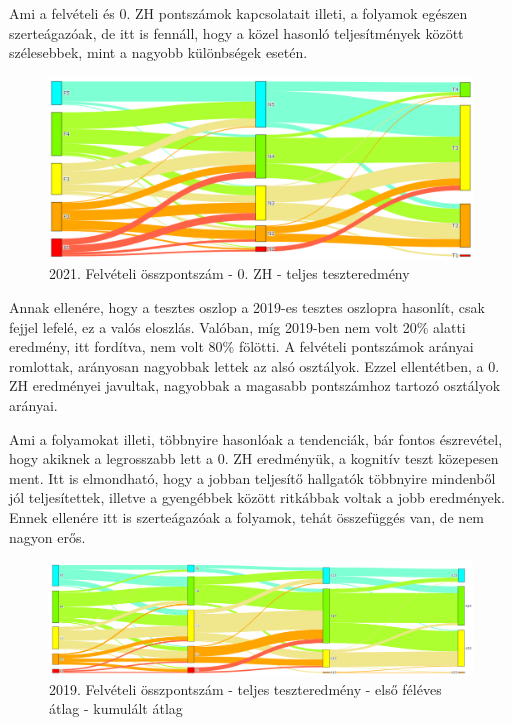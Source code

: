\documentclass[12pt]{article}
\begin{document}
Ami a felvételi és 0. ZH pontszámok kapcsolatait illeti, a folyamok egészen szerteágazóak, de itt is fennáll, hogy a közel hasonló teljesítmények között szélesebbek, mint a nagyobb különbségek esetén.

\begin{figure}[H]
\centering
\includegraphics[width = \textwidth]{kepek/2021_old_felvi_0zh_teszt.png}
\caption{2021. Felvételi összpontszám - 0. ZH - teljes teszteredmény}
\label{fig:2021_old_felvi_0zh_teszt}
\end{figure}

Annak ellenére, hogy a tesztes oszlop a 2019-es tesztes oszlopra hasonlít, csak fejjel lefelé, ez a valós eloszlás. Valóban, míg 2019-ben nem volt 20\% alatti eredmény, itt fordítva, nem volt 80\% fölötti. A felvételi pontszámok arányai romlottak, arányosan nagyobbak lettek az alsó osztályok. Ezzel ellentétben, a 0. ZH eredményei javultak, nagyobbak a magasabb pontszámhoz tartozó osztályok arányai. 

Ami a folyamokat illeti, többnyire hasonlóak a tendenciák, bár fontos észrevétel, hogy akiknek a legrosszabb lett a 0. ZH eredményük, a kognitív teszt közepesen ment. Itt is elmondható, hogy a jobban teljesítő hallgatók többnyire mindenből jól teljesítettek, illetve a gyengébbek között ritkábbak voltak a jobb eredmények. Ennek ellenére itt is szerteágazóak a folyamok, tehát összefüggés van, de nem nagyon erős.


\begin{figure}[H]
\centering
\includegraphics[width = \textwidth]{kepek/2019_felvi_teszt_atlag_kumatlag.png}
\caption{2019. Felvételi összpontszám - teljes teszteredmény - első féléves átlag - kumulált átlag}
\label{fig:2019_felvi_teszt_atlag_kumatlag}
\end{figure}
\end{document}
